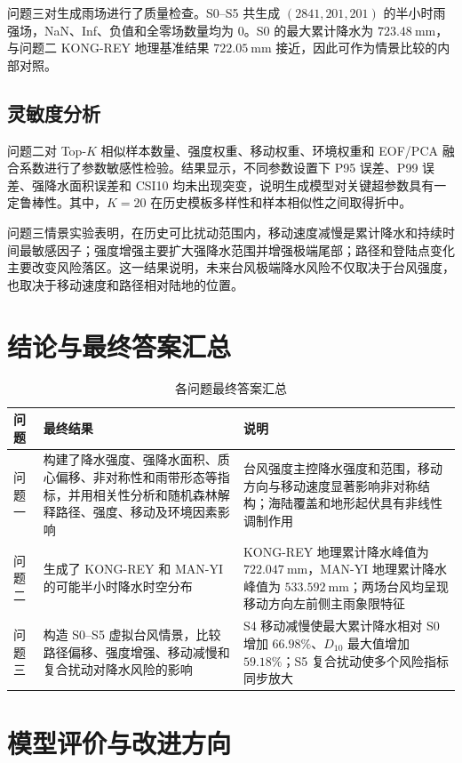 \documentclass[UTF8,a4paper,zihao=5,fontset=fandol]{ctexart}
\numberwithin{equation}{section}
\numberwithin{figure}{section}
\numberwithin{table}{section}
\begin{document}
问题三对生成雨场进行了质量检查。S0--S5 共生成 $(2841,201,201)$ 的半小时雨强场，NaN、Inf、负值和全零场数量均为 $0$。S0 的最大累计降水为 $723.48\ \mathrm{mm}$，与问题二 KONG-REY 地理基准结果 $722.05\ \mathrm{mm}$ 接近，因此可作为情景比较的内部对照。

\subsection{灵敏度分析}
问题二对 Top-$K$ 相似样本数量、强度权重、移动权重、环境权重和 EOF/PCA 融合系数进行了参数敏感性检验。结果显示，不同参数设置下 P95 误差、P99 误差、强降水面积误差和 CSI10 均未出现突变，说明生成模型对关键超参数具有一定鲁棒性。其中，$K=20$ 在历史模板多样性和样本相似性之间取得折中。

问题三情景实验表明，在历史可比扰动范围内，移动速度减慢是累计降水和持续时间最敏感因子；强度增强主要扩大强降水范围并增强极端尾部；路径和登陆点变化主要改变风险落区。这一结果说明，未来台风极端降水风险不仅取决于台风强度，也取决于移动速度和路径相对陆地的位置。

\section{结论与最终答案汇总}

\begin{table}[H]
  \centering
  \caption{各问题最终答案汇总}
  \begin{tabularx}{\linewidth}{lXX}
    \toprule
    问题 & 最终结果 & 说明 \\
    \midrule
    问题一 & 构建了降水强度、强降水面积、质心偏移、非对称性和雨带形态等指标，并用相关性分析和随机森林解释路径、强度、移动及环境因素影响 & 台风强度主控降水强度和范围，移动方向与移动速度显著影响非对称结构；海陆覆盖和地形起伏具有非线性调制作用 \\
    问题二 & 生成了 KONG-REY 和 MAN-YI 的可能半小时降水时空分布 & KONG-REY 地理累计降水峰值为 $722.047\ \mathrm{mm}$，MAN-YI 地理累计降水峰值为 $533.592\ \mathrm{mm}$；两场台风均呈现移动方向左前侧主雨象限特征 \\
    问题三 & 构造 S0--S5 虚拟台风情景，比较路径偏移、强度增强、移动减慢和复合扰动对降水风险的影响 & S4 移动减慢使最大累计降水相对 S0 增加 $66.98\%$、$D_{10}$ 最大值增加 $59.18\%$；S5 复合扰动使多个风险指标同步放大 \\
    \bottomrule
  \end{tabularx}
\end{table}

\section{模型评价与改进方向}
\end{document}
